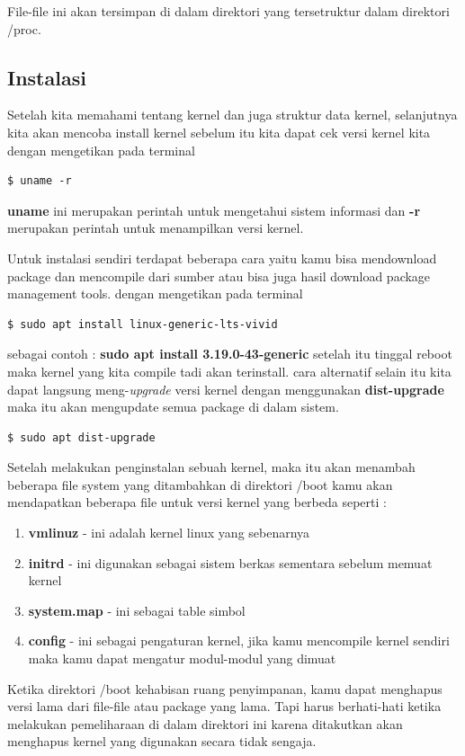 
File-file ini akan tersimpan di dalam direktori yang tersetruktur dalam direktori /proc.

\subsection{Instalasi}
Setelah kita memahami tentang kernel dan juga struktur data kernel, selanjutnya kita akan mencoba install kernel sebelum itu kita dapat cek versi kernel kita dengan mengetikan pada terminal 
\begin{verbatim}
$ uname -r 
\end{verbatim}
\textbf{uname} ini merupakan perintah untuk mengetahui sistem informasi dan \textbf{-r} merupakan perintah untuk menampilkan versi kernel.
 
Untuk instalasi sendiri terdapat beberapa cara yaitu kamu bisa mendownload package dan mencompile dari sumber atau bisa juga hasil download package management tools.
dengan mengetikan pada terminal
\begin{verbatim}
$ sudo apt install linux-generic-lts-vivid
\end{verbatim}
 sebagai contoh : \textbf{sudo apt install 3.19.0-43-generic} setelah itu tinggal reboot maka kernel yang kita compile tadi akan terinstall.
cara alternatif selain itu kita dapat langsung meng-\textit{upgrade} versi kernel dengan menggunakan \textbf{dist-upgrade} maka itu akan mengupdate semua package di dalam sistem. 
 \begin{verbatim}
$ sudo apt dist-upgrade
\end{verbatim}

Setelah melakukan penginstalan sebuah kernel, maka itu akan menambah beberapa file system yang ditambahkan di direktori /boot
kamu akan mendapatkan beberapa file untuk versi kernel yang berbeda seperti :
\begin{enumerate}
\item \textbf{vmlinuz} - ini adalah kernel linux yang sebenarnya
\item \textbf{initrd} - ini digunakan sebagai sistem berkas sementara sebelum memuat kernel
\item \textbf{system.map} - ini sebagai table simbol 
\item \textbf{config} - ini sebagai pengaturan kernel, jika kamu mencompile kernel sendiri maka kamu dapat mengatur modul-modul yang dimuat
\end{enumerate}
Ketika direktori /boot kehabisan ruang penyimpanan, kamu dapat menghapus versi lama dari file-file atau package yang lama. Tapi harus berhati-hati ketika melakukan pemeliharaan di dalam direktori ini karena ditakutkan akan menghapus kernel yang digunakan secara tidak sengaja.

